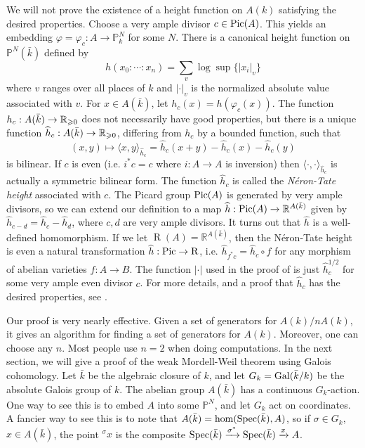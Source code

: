 \documentclass{article}
\begin{document}
We will not prove the existence of a height function on $A(k)$ satisfying the 
desired properties. Choose a very ample divisor $c\in \operatorname{Pic}(A)$. This yields 
an embedding $\varphi=\varphi_c:A\to \mathbb{P}_k^N$ for some $N$. There is a 
canonical height function on $\mathbb{P}^N(\bar k)$ defined by 
\[
  h(x_0:\dotsm : x_n) = \sum_v \log \sup\{|x_i|_v\}
\]
where $v$ ranges over all places of $k$ and $|\cdot|_v$ is the normalized 
absolute value associated with $v$. For $x\in A(\bar k)$, let 
$h_c(x) = h(\varphi_c(x))$. The function $h_c:A(\bar k)\to \mathbb{R}_{\geqslant 0}$ 
does not necessarily have good properties, but there is a unique function 
$\widehat h_c:A(\bar k)\to \mathbb{R}_{\geqslant 0}$, differing from $h_c$ by a 
bounded function, such that 
\[
  (x,y)\mapsto \langle x,y\rangle_{\widehat h_c} = \widehat h_c(x+y) - \widehat h_c(x) - \widehat h_c(y)
\]
is bilinear. If $c$ is even (i.e. $i^*c = c$ where $i:A\to A$ is inversion) 
then $\langle \cdot,\cdot\rangle_{\widehat h_c}$ is actually a symmetric 
bilinear form. The function $\widehat h_c$ is called the \emph{N\'eron-Tate 
height} associated with $c$. The Picard group $\operatorname{Pic}(A)$ is generated by very 
ample divisors, so we can extend our definition to a map 
$\widehat h:\operatorname{Pic}(A)\to \mathbb{R}^{A(\bar k)}$ given by 
$\widehat h_{c-d} = \widehat h_c - \widehat h_d$, where $c,d$ are very 
ample divisors. It turns out that $\widehat h$ is a well-defined 
homomorphism. If we let 
$\operatorname{R}(A) = \mathbb{R}^{A(\bar k)}$, then the N\'eron-Tate height 
is even a natural transformation $\widehat h : \operatorname{Pic}\to \operatorname{R}$, 
i.e. $\widehat h_{f^* c} = \widehat h_c\circ f$ for any morphism of abelian 
varieties $f:A\to B$. The function $|\cdot|$ used in the proof of is just 
$\widehat h_c^{1/2}$ for some very ample even divisor $c$. For more details, 
and a proof that $\widehat h_c$ has the desired properties, see \cite[9.2]{bg06}.









Our proof is very nearly effective. Given a set of generators for 
$A(k)/n A(k)$, it gives an algorithm for finding a set of generators for 
$A(k)$. Moreover, one can choose any $n$. Most people use $n = 2$ when doing 
computations. In the next section, we will give a proof of the weak 
Mordell-Weil theorem using Galois cohomology. Let $\bar k$ be the algebraic 
closure of $k$, and let  $G_k = \operatorname{Gal}(\bar k/k)$ be the absolute Galois group of 
$k$. The abelian group $A(\bar k)$ has a continuous $G_k$-action. One way to 
see this is to embed $A$ into some $\mathbb{P}^N$, and let $G_k$ act on 
coordinates. A fancier way to see this is to note that 
$A(\bar k) = \hom(\operatorname{Spec}(\bar k),A)$, so if $\sigma\in G_k$, $x\in A(\bar k)$, 
the point $^\sigma x$ is the composite 
$\operatorname{Spec}(\bar k)\xrightarrow{\sigma^*} \operatorname{Spec}(\bar k) \xrightarrow{x} A$. 
\end{document}
